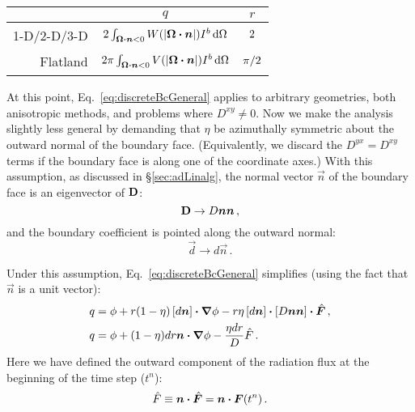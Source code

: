 \begin{table}[tb]
  \centering
  \begin{tabular}{rcc}
\toprule
& $q$
& $r$
\\ \midrule
1-D/2-D/3-D
& $2 \int_{\bm{\Omega}\bm{\cdot}\bm{n} < 0}
  W(\left| \bm{\Omega}\bm{\cdot}\bm{n} \right|) I^b \mathop{}\!\mathrm{d}\Omega$
  & $2\vphantom{\Big|}$
\\
Flatland
& $2 \pi \int_{\bm{\Omega}\bm{\cdot}\bm{n} < 0}
  V(\left| \bm{\Omega}\bm{\cdot}\bm{n} \right|) I^b \mathop{}\!\mathrm{d}\Omega$
& $\pi/2\vphantom{\Big|}$
\\ \bottomrule
  \end{tabular}
  \label{tab:discreteBcCoeffs}
\end{table}

At this point, Eq.~\eqref{eq:discreteBcGeneral} applies to arbitrary geometries,
both anisotropic methods, and problems where $D^{xy} \ne 0$.
Now we make the analysis slightly less general by demanding
that $\eta$ be azimuthally symmetric about the outward normal of the boundary face.
(Equivalently, we discard the $D^{yx}=D^{xy}$ terms if the boundary face is
along one of the coordinate axes.) With this assumption, as discussed in
\S\ref{sec:adLinalg}, the normal vector $\vec{n}$ of the boundary face is an
eigenvector of $\mathbf{D}$:
\begin{equation*}
  \mathbf{D} \to D \bm{n}\bm{n}\,,
\end{equation*}
and the boundary coefficient is pointed along the outward normal:
\begin{equation*}
  \vec{d} \to d \vec{n}\,.
\end{equation*}

Under this assumption, Eq.~\eqref{eq:discreteBcGeneral} simplifies
(using the fact that $\vec{n}$ is a unit vector):
\begin{align} \nonumber
  q &= \phi + r (1 - \eta) \left[ d \bm{n} \right] \bm{\cdot} \bm{\nabla} \phi
  - r \eta \left[ d \bm{n} \right] \bm{\cdot} \left[ D \bm{n}\bm{n} \right] \bm{\cdot}
  \hat{\bm{F}}\,,
  \\ \label{eq:discreteBcGeneralQ}
 q &=  \phi + (1 - \eta) dr \bm{n} \bm{\cdot} \bm{\nabla} \phi
  - \frac{\eta dr}{D} \hat{F} \,.
\end{align}
Here we have defined the outward component of the radiation flux at the
beginning of the time step ($t^n$):
\begin{equation*}
  \hat{F} \equiv  \bm{n} \bm{\cdot} \hat{\bm{F}} = \bm{n} \bm{\cdot} \bm{F}(t^n)\,.
\end{equation*}

